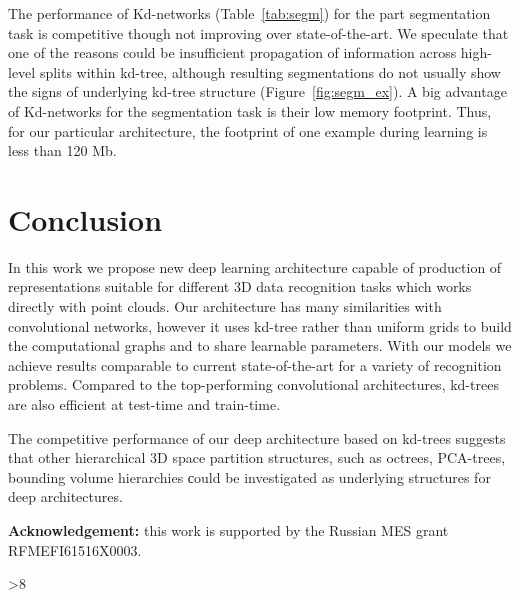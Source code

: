 \documentclass[10pt,twocolumn,letterpaper]{article}
\newcommand{\fig}[1]{Figure~\ref{fig:#1}}
\newcommand{\tab}[1]{Table~\ref{tab:#1}}
\begin{document}
The performance of Kd-networks (\tab{segm}) for the part segmentation task is competitive though not improving over state-of-the-art. We speculate that one of the reasons could be insufficient propagation of information across high-level splits within kd-tree, although resulting segmentations do not usually show the signs of underlying kd-tree structure (\fig{segm_ex}). A big advantage of Kd-networks for the segmentation task is their low memory footprint. Thus, for our particular architecture, the footprint of one example during learning is less than 120 Mb.
 \section{Conclusion}
\label{sect:conclusion}

In this work we propose new deep learning architecture capable of production of representations suitable for different 3D data recognition tasks which works directly with point clouds. Our architecture has many similarities with convolutional networks, however it uses kd-tree rather than uniform grids to build the computational graphs and to share learnable parameters. With our models we achieve results comparable to current state-of-the-art for a variety of recognition problems. Compared to the top-performing convolutional architectures, kd-trees are also efficient at test-time and train-time.

The competitive performance of our deep architecture based on kd-trees suggests that other hierarchical 3D space partition structures, such as octrees, PCA-trees, bounding volume hierarchies сould be investigated as underlying structures for deep architectures.

{\bf Acknowledgement:} this work is supported by the Russian MES grant RFMEFI61516X0003. 


\FloatBarrier

\ifnum\value{page}>8 \fi
{\small


}
\end{document}
